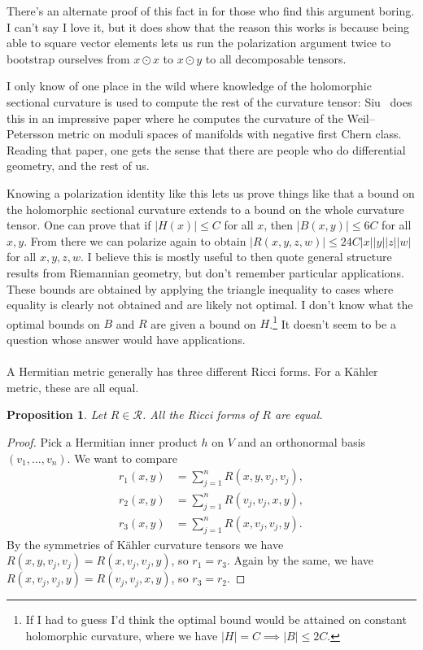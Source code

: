 \documentclass[10pt,a4paper]{article}
\newtheorem{prop}[theo]{Proposition}
\newtheorem*{proof}{Proof}
\newcommand{\cc}[1]{\mathcal{#1}}
\begin{document}
There's an alternate proof of this fact in \cite[Lemma~7.19]{zheng2000complex} for those who find this argument boring. I can't say I love it, but it does show that the reason this works is because being able to square vector elements lets us run the polarization argument twice to bootstrap ourselves from $x \odot x$ to $x \odot y$ to all decomposable tensors.

I only know of one place in the wild where knowledge of the holomorphic sectional curvature is used to compute the rest of the curvature tensor: Siu~\cite{siu1986curvature} does this in an impressive paper where he computes the curvature of the Weil--Petersson metric on moduli spaces of manifolds with negative first Chern class. Reading that paper, one gets the sense that there are people who do differential geometry, and the rest of us.

Knowing a polarization identity like this lets us prove things like that a bound on the holomorphic sectional curvature extends to a bound on the whole curvature tensor. One can prove that if $|H(x)| \leq C$ for all $x$, then $|B(x,y)| \leq 6 C$ for all $x,y$. From there we can polarize again to obtain $|R(x,y,z,w)| \leq 24C |x||y||z||w|$ for all $x,y,z,w$. I believe this is mostly useful to then quote general structure results from Riemannian geometry, but don't remember particular applications. These bounds are obtained by applying the triangle inequality to cases where equality is clearly not obtained and are likely not optimal. I don't know what the optimal bounds on $B$ and $R$ are given a bound on $H$.\footnote{If I had to guess I'd think the optimal bound would be attained on constant holomorphic curvature, where we have $|H| = C \implies |B| \leq 2C$.} It doesn't seem to be a question whose answer would have applications.

\paragraph{}
A Hermitian metric generally has three different Ricci forms. For a K\"ahler metric, these are all equal.

\begin{prop}
Let $R \in \cc R$. All the Ricci forms of $R$ are equal.
\end{prop}

\begin{proof}
  Pick a Hermitian inner product $h$ on $V$ and an orthonormal basis $(v_1,\ldots,v_n)$. We want to compare
\begin{align*}
r_1(x,y) &= \sum_{j=1}^n R(x,y,v_j,v_j),
\\
r_2(x,y) &= \sum_{j=1}^n R(v_j, v_j, x,y),
\\
r_3(x,y) &= \sum_{j=1}^n R(x,v_j,v_j,y).
\end{align*}
By the symmetries of K\"ahler curvature tensors we have $R(x,y,v_j,v_j) = R(x,v_j,v_j,y)$, so $r_1 = r_3$. Again by the same, we have $R(x,v_j,v_j,y) = R(v_j,v_j,x,y)$, so $r_3 = r_2$.
\end{proof}
\end{document}
